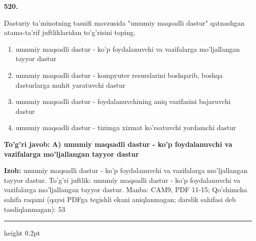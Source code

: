 \documentclass[10pt,a4paper]{article}
\begin{document}
{\bfseries\sffamily\color{ink} 520.}
\par
Dasturiy ta'minotning tasnifi mavzusida "umumiy maqsadli dastur" qatnashgan atama-ta'rif juftliklaridan to'g'risini toping.
\begin{enumerate}[label=\Alph*),leftmargin=9mm]
\item umumiy maqsadli dastur - ko'p foydalanuvchi va vazifalarga mo'ljallangan tayyor dastur
\item umumiy maqsadli dastur - kompyuter resurslarini boshqarib, boshqa dasturlarga muhit yaratuvchi dastur
\item umumiy maqsadli dastur - foydalanuvchining aniq vazifasini bajaruvchi dastur
\item umumiy maqsadli dastur - tizimga xizmat ko'rsatuvchi yordamchi dastur
\end{enumerate}
\begin{tcolorbox}[enhanced,breakable,colback=teal!4,colframe=teal!60!black,boxrule=0.45pt,arc=1.2mm,left=2.7mm,right=2.7mm,top=1.8mm,bottom=1.8mm,before skip=2mm,after skip=2mm]
{\bfseries\sffamily\color{teal}To'g'ri javob:} \textbf{A) umumiy maqsadli dastur - ko'p foydalanuvchi va vazifalarga mo'ljallangan tayyor dastur}
\par\smallskip
{\bfseries Izoh:} umumiy maqsadli dastur - ko'p foydalanuvchi va vazifalarga mo'ljallangan tayyor dastur. To'g'ri juftlik: umumiy maqsadli dastur - ko'p foydalanuvchi va vazifalarga mo'ljallangan tayyor dastur. Manba: CAM9, PDF 11-15; Qo'shimcha sahifa raqami (qaysi PDFga tegishli ekani aniqlanmagan; darslik sahifasi deb tasdiqlanmagan): 53
\end{tcolorbox}
\vspace{2mm}\hrule height 0.2pt\vspace{3mm}
\end{document}
